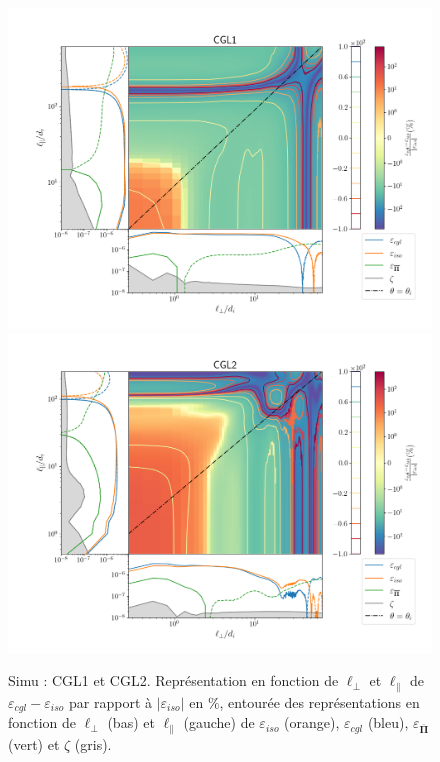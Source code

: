  \begin{figure}[!ht]
  \centering
  \includegraphics[width=0.95\linewidth,trim=1cm 0cm 0cm 2cm, clip=true]{./Mainmatter/Part_3/images_ch3/CGL1_panel_isocgl_percent}
 \includegraphics[width=0.95\linewidth,trim=1cm 0cm 0cm 2cm, clip=true]{./Mainmatter/Part_3/images_ch3/CGL2_panel_isocgl_percent}
 \cprotect\caption{Simu : CGL1 et CGL2. Représentation  en fonction de \ensuremath{\ell_{\perp}} et \ensuremath{\ell_{\parallel}} de \ensuremath{\varepsilon_{cgl}-\varepsilon_{iso}} par rapport à \ensuremath{|\varepsilon_{iso}|} en \ensuremath{\%}, entourée des représentations  en fonction de \ensuremath{\ell_{\perp}} (bas) et \ensuremath{\ell_{\parallel}} (gauche) de \ensuremath{\varepsilon_{iso}} (orange), \ensuremath{\varepsilon_{cgl}} (bleu), \ensuremath{\varepsilon_{\overline{\boldsymbol{\Pi}}}} (vert) et \ensuremath{\zeta} (gris). }
 \label{fig:trip_CGL1-2}
 \end{figure}
